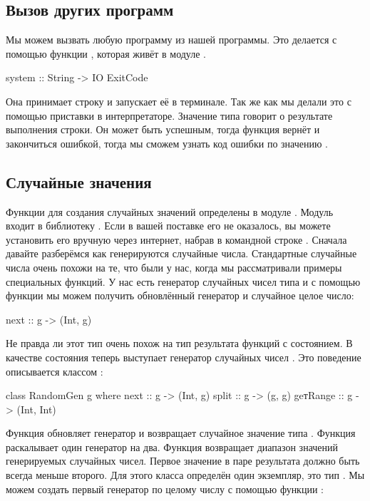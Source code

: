 \subsection{Вызов других программ}

Мы можем вызвать любую программу из нашей программы. Это делается с
помощью функции , которая живёт в модуле .


\begin{code}
system :: String -> IO ExitCode
\end{code}

Она принимает строку и запускает её в терминале. Так же как мы делали
это с помощью приставки \In{:!} в интерпретаторе. Значение типа
 говорит о результате выполнения строки. Он может быть
успешным, тогда функция вернёт  и закончиться ошибкой,
тогда мы сможем узнать код ошибки по значению .

\subsection{Случайные значения}

Функции для создания случайных значений определены в модуле
. Модуль  входит в библиотеку
. Если в вашей поставке  его не оказалось, вы можете
установить его вручную через интернет, набрав в командной строке
. Сначала давайте разберёмся как генерируются
случайные числа. Стандартные случайные числа очень похожи на те, что
были у нас, когда мы рассматривали примеры специальных функций. У нас
есть генератор случайных чисел типа  и с помощью функции 
мы можем получить обновлённый генератор и случайное целое число:


\begin{code}
next :: g -> (Int, g)
\end{code}

Не правда ли этот тип очень похож на тип результата функций с
состоянием. В качестве состояния теперь выступает генератор случайных
чисел . Это поведение описывается классом :


\begin{code}
class RandomGen g where
    next     :: g -> (Int, g)
    split    :: g -> (g, g)
    geтRange :: g -> (Int, Int)
\end{code}

Функция  обновляет генератор и возвращает случайное значение
типа . Функция  раскалывает один генератор на два.
Функция  возвращает диапазон значений генерируемых
случайных чисел. Первое значение в паре результата  должно
быть всегда меньше второго. Для этого класса определён один экземпляр,
это тип . Мы можем создать первый генератор по целому числу с
помощью функции :


